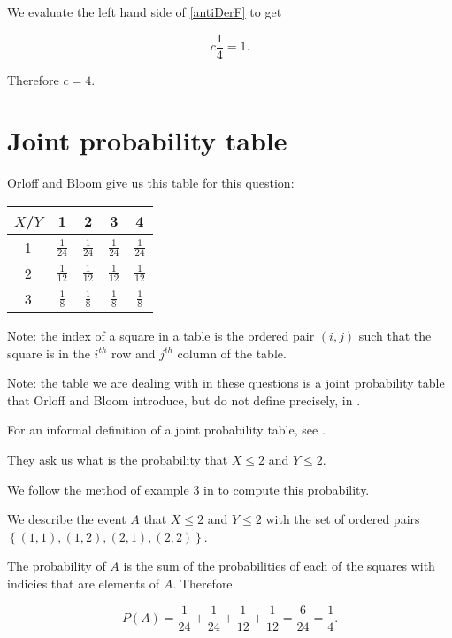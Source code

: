 \documentclass[a4paper,11pt]{article}
\begin{document}
We evaluate the left hand side of  \ref{antiDerF} to get

\begin{equation}\label{antiDerF2}
  c \frac{1}{4}  = 1.
\end{equation}

Therefore $c=4$.

\section{Joint probability table}

Orloff and Bloom give us this table for this question:
\begin{center}
  \begin{tabular}{ | c | c | c | c  | c | }
    \hline
    $X$/$Y$ & 1 & 2 & 3 & 4 \\ \hline
    1 & $\frac{1}{24}$ & $\frac{1}{24}$ & $\frac{1}{24}$ & $\frac{1}{24}$ \\ \hline
    2 & $\frac{1}{12}$ & $\frac{1}{12}$ & $\frac{1}{12}$ & $\frac{1}{12}$ \\ \hline
    3 & $\frac{1}{8}$ & $\frac{1}{8}$ & $\frac{1}{8}$ & $\frac{1}{8}$ \\ \hline
  \end{tabular}
\end{center}

Note: the index of a square in a table is the ordered pair $\left(i, j \right)$
such that the square is in the $i^{th}$ row and $j^{th}$ column of the
table.

Note: the table we are dealing with in these questions is a joint probability
table that Orloff and Bloom introduce, but do not define precisely, in
\cite{reading7}.

For an informal definition of a joint probability table, see
\cite{defProbTable}.

They ask us what is the probability that $X \leq 2$ and $Y \leq 2$.

We follow the method of example 3 in \cite{reading7} to compute this
probability.

We describe the event $A$ that $X \leq 2$ and $Y \leq 2$ with the set of ordered pairs
$\left\{ \left( 1,1 \right), \left(1, 2 \right), \left(2, 1 \right),
\left( 2, 2 \right) \right\}$.

The probability of $A$ is the sum of the probabilities of each of the squares
with indicies that are elements of $A$.  Therefore

\begin{equation}
P\left( A \right) =   \frac{1}{24} + \frac{1}{24} + \frac{1}{12} + \frac{1}{12}
 = \frac{6}{24} = \frac{1}{4}.
\end{equation}
\end{document}
